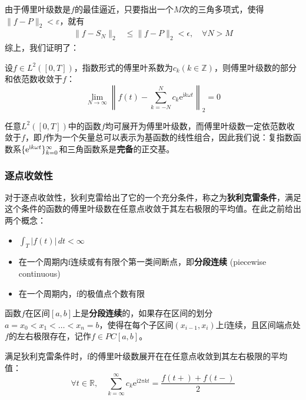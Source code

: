 由于傅里叶级数是$f$的最佳逼近，只要指出一个$M$次的三角多项式，使得$\|f-P\|_2<\varepsilon$，就有
\begin{align*}
    \|f-S_N\|_2 & \leq \|f-P\|_2<\epsilon,\quad\forall N>M
\end{align*}
综上，我们证明了：
\begin{theorem}[傅里叶级数的依范数收敛性]
    设$f\in L^2([0,T])$，指数形式的傅里叶系数为$c_k(k\in\mathbb{Z} )$，则傅里叶级数的部分和依范数收敛于$f$：
    \[\lim_{N \to \infty} \left\| f(t)-\sum_{k=-N}^{N}c_k \mathrm{e}^{\mathrm{i}k\omega t}\right\|_2=0\]
\end{theorem}

任意$L^2([0,T])$中的函数$f$均可展开为傅里叶级数，而傅里叶级数一定依范数收敛于$f$，即$f$作为一个矢量总可以表示为基函数的线性组合，因此我们说：复指数函数系$\{\mathrm{e}^{\mathrm{i} k\omega t}\}_{k=0}^{\infty}$和三角函数系是\textbf{完备}的正交基。

\subsubsection{逐点收敛性}

对于逐点收敛性，狄利克雷给出了它的一个充分条件，称之为\textbf{狄利克雷条件}，满足这个条件的函数的傅里叶级数在任意点收敛于其左右极限的平均值。在此之前给出两个概念：

\begin{definition}[狄利克雷条件]
    \quad
    \begin{itemize}[nosep, left=0pt]
    \item $\int_{T}|f(t)|\,dt<\infty$
    \item 在一个周期内f连续或有有限个第一类间断点，即\textbf{分段连续} (piecewise continuous)
    \item 在一个周期内，f的极值点个数有限
\end{itemize}
\end{definition}
\begin{definition}[分段连续]
    \label{def:piecewise_continuos}
    函数$f$在区间$[a,b]$上是\textbf{分段连续}的，如果存在区间的划分$a=x_0<x_1<\dots <x_n=b$，使得在每个子区间$(x_{i-1},x_i)$上f连续，且区间端点处$f$的左右极限存在，记作$f\in PC[a,b]$。
\end{definition}

\begin{theorem}[狄利克雷定理]
    满足狄利克雷条件时，f的傅里叶级数展开在在任意点收敛到其左右极限的平均值：
    \[\forall t\in \mathbb{R},\quad\sum_{k=\infty}^{\infty}c_k \mathrm{e}^{\mathrm{i}2\pi kt}=\frac{f(t+)+f(t-)}{2}\]
\end{theorem}

